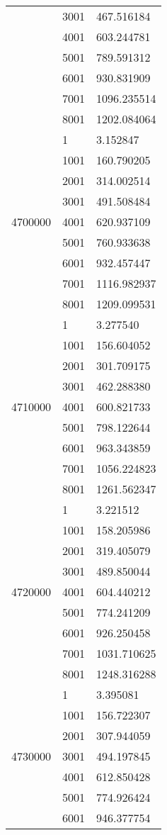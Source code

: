 \begin{table}[htb!]
\begin{tabular}{lll}
 & 3001 & 467.516184 \\
 & 4001 & 603.244781 \\
 & 5001 & 789.591312 \\
 & 6001 & 930.831909 \\
 & 7001 & 1096.235514 \\
 & 8001 & 1202.084064 \\
\multirow[c]{9}{*}{4700000} & 1 & 3.152847 \\
 & 1001 & 160.790205 \\
 & 2001 & 314.002514 \\
 & 3001 & 491.508484 \\
 & 4001 & 620.937109 \\
 & 5001 & 760.933638 \\
 & 6001 & 932.457447 \\
 & 7001 & 1116.982937 \\
 & 8001 & 1209.099531 \\
\multirow[c]{9}{*}{4710000} & 1 & 3.277540 \\
 & 1001 & 156.604052 \\
 & 2001 & 301.709175 \\
 & 3001 & 462.288380 \\
 & 4001 & 600.821733 \\
 & 5001 & 798.122644 \\
 & 6001 & 963.343859 \\
 & 7001 & 1056.224823 \\
 & 8001 & 1261.562347 \\
\multirow[c]{9}{*}{4720000} & 1 & 3.221512 \\
 & 1001 & 158.205986 \\
 & 2001 & 319.405079 \\
 & 3001 & 489.850044 \\
 & 4001 & 604.440212 \\
 & 5001 & 774.241209 \\
 & 6001 & 926.250458 \\
 & 7001 & 1031.710625 \\
 & 8001 & 1248.316288 \\
\multirow[c]{9}{*}{4730000} & 1 & 3.395081 \\
 & 1001 & 156.722307 \\
 & 2001 & 307.944059 \\
 & 3001 & 494.197845 \\
 & 4001 & 612.850428 \\
 & 5001 & 774.926424 \\
 & 6001 & 946.377754 \\

\end{tabular}
\end{table}
